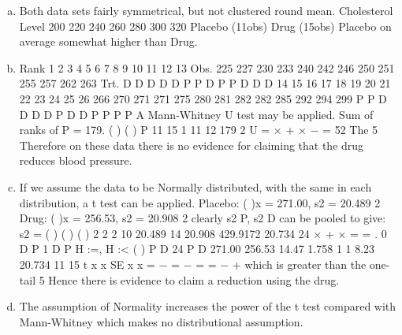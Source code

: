 \documentclass[a4paper,12pt]{article}
\begin{document}
\begin{enumerate}[(a)]
\item  Both data sets fairly symmetrical, but not clustered round mean.
Cholesterol Level
200 220 240 260 280 300 320
Placebo (11obs)
Drug (15obs)
Placebo on average somewhat higher than Drug.
\item 
Rank 1 2 3 4 5 6 7 8 9 10 11 12 13
Obs. 225 227 230 233 240 242 246 250 251 255 257 262 263
Trt. D D D D D P P D P P D D D
14 15 16 17 18 19 20 21 22 23 24 25 26
266 270 271 271 275 280 281 282 282 285 292 294 299
P P D D D D P D D P P P P
A Mann-Whitney U test may be applied.
Sum of ranks of P = 179. ( ) ( ) P
11 15 1 11 12 179
2
U = × + × −
= 52
The 5%
Therefore on these data there is no evidence for claiming that the drug reduces blood
pressure.
\item If we assume the data to be Normally distributed, with the same  in each
distribution, a t test can be applied.
Placebo: ( )x = 271.00, s2 = 20.489 2
Drug: ( )x = 256.53, s2 = 20.908 2
clearly s2
P, s2
D can be pooled to give:
s2 = ( ) ( ) ( )
2 2
2 10 20.489 14 20.908
429.9172 20.734
24
× + ×
= = .
0 D P 1 D P H :\mu =\mu , H :\mu < \mu
( )
P D
24
P D
271.00 256.53 14.47 1.758
1 1 8.23 20.734
11 15
t x x
SE x x
= − = − = =
−
+
which is greater than the one-tail 5%
Hence there is evidence to claim a reduction using the drug.
\item The assumption of Normality increases the power of the t test compared with
Mann-Whitney which makes no distributional assumption.
\end{enumerate}
\end{document}
